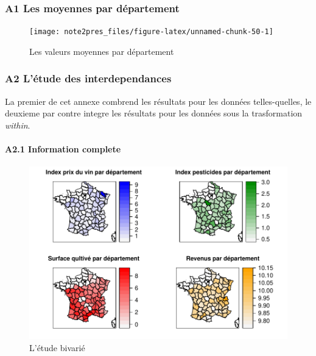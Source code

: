 \documentclass[11pt,]{article}
\let\oldparagraph\paragraph
\renewcommand{\paragraph}[1]{\oldparagraph{#1}\mbox{}}
\begin{document}
\hypertarget{a1-les-moyennes-par-departement}{%
\subsubsection{A1 Les moyennes par
département}\label{a1-les-moyennes-par-departement}}

\FloatBarrier

\begin{figure}[!htbp]

{\centering \texttt{[image: note2pres\_files/figure-latex/unnamed-chunk-50-1]} 

}

\caption{Les valeurs moyennes par département}\label{fig:unnamed-chunk-50}
\end{figure}

\FloatBarrier

\newpage

\hypertarget{a2-letude-des-interdependances}{%
\subsubsection{A2 L'étude des
interdependances}\label{a2-letude-des-interdependances}}

La premier de cet annexe combrend les résultats pour les données
telles-quelles, le deuxieme par contre integre les résultats pour les
données sous la trasformation \emph{within}.

\hypertarget{a2.1-information-complete}{%
\paragraph{A2.1 Information complete}\label{a2.1-information-complete}}

\FloatBarrier

\begin{figure}[!htbp]

{\centering \includegraphics{note2pres_files/figure-latex/unnamed-chunk-51-1} 

}

\caption{L'étude bivarié}\label{fig:unnamed-chunk-51}
\end{figure}
\end{document}
